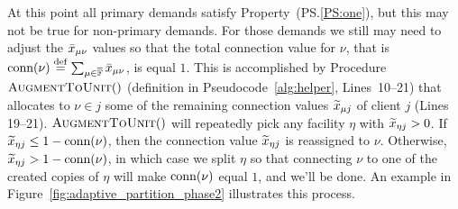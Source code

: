 \documentclass[oneside,final]{ucr}
\def\ssp{\def\baselinestretch{1.0}\large\normalsize}
\begin{document}
At this point all primary demands satisfy
Property~(PS.\ref{PS:one}), but this may not be true for
non-primary demands. For those demands we still may need to
adjust the ${\bar x}_{\mu\nu}$ values so that the total
connection value for $\nu$, that is ${\textrm{conn}}(\nu) \stackrel{\mathrm{def}}{=}
\sum_{\mu\in\overline{\mathbb{F}}}{\bar x}_{\mu \nu}$, is equal $1$. This
is accomplished by Procedure ${\textsc{AugmentToUnit}}()$ (definition
in Pseudocode~\ref{alg:helper}, Lines~10--21) that allocates
to $\nu\in j$ some of the remaining connection values
${\widetilde x}_{\mu j}$ of client $j$ (Lines 19--21).
${\textsc{AugmentToUnit}}()$ will repeatedly pick any facility $\eta$ with
${\widetilde x}_{\eta j} >0$.  If ${\widetilde x}_{\eta j} \leq
1-{\textrm{conn}}(\nu)$, then the connection value ${\widetilde x}_{\eta
  j}$ is reassigned to $\nu$. 
Otherwise, ${\widetilde x}_{\eta j} >
1-{\textrm{conn}}(\nu)$, in which case we split $\eta$ so that
connecting $\nu$ to one of the created copies of $\eta$ will
make ${\textrm{conn}}(\nu)$ equal $1$, and we'll be done. An
example in Figure~\ref{fig:adaptive_partition_phase2}
illustrates this process.
\ssp
\end{document}
